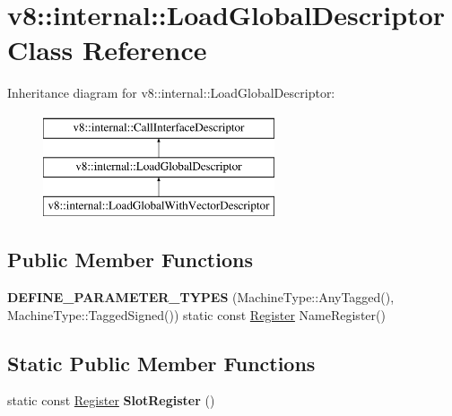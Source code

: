 \hypertarget{classv8_1_1internal_1_1LoadGlobalDescriptor}{}\section{v8\+:\+:internal\+:\+:Load\+Global\+Descriptor Class Reference}
\label{classv8_1_1internal_1_1LoadGlobalDescriptor}
Inheritance diagram for v8\+:\+:internal\+:\+:Load\+Global\+Descriptor\+:\begin{figure}[H]
\begin{center}
\leavevmode
\includegraphics[height=3.000000cm]{classv8_1_1internal_1_1LoadGlobalDescriptor}
\end{center}
\end{figure}
\subsection*{Public Member Functions}
\begin{DoxyCompactItemize}
\item 
\mbox{\label{classv8_1_1internal_1_1LoadGlobalDescriptor_ae3aed2b2233699dcbaaa809060628366}} 
{\bfseries D\+E\+F\+I\+N\+E\+\_\+\+P\+A\+R\+A\+M\+E\+T\+E\+R\+\_\+\+T\+Y\+P\+ES} (Machine\+Type\+::\+Any\+Tagged(), Machine\+Type\+::\+Tagged\+Signed()) static const \mbox{\hyperlink{classv8_1_1internal_1_1Register}{Register}} Name\+Register()
\end{DoxyCompactItemize}
\subsection*{Static Public Member Functions}
\begin{DoxyCompactItemize}
\item 
\mbox{\label{classv8_1_1internal_1_1LoadGlobalDescriptor_a2e4e4f8be691c1fdb200e0218e7e31ef}} 
static const \mbox{\hyperlink{classv8_1_1internal_1_1Register}{Register}} {\bfseries Slot\+Register} ()
\end{DoxyCompactItemize}
